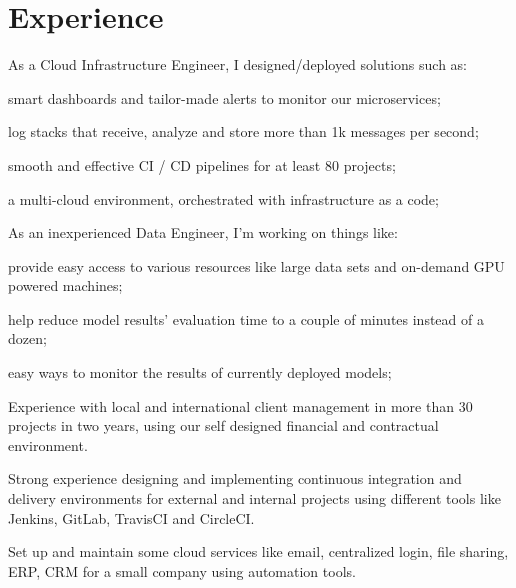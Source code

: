 \documentclass[]{deedy-resume-openfont}
\begin{document}
\begin{minipage}[t]{0.66\textwidth}
    \section{Experience}
    As a Cloud Infrastructure Engineer, I designed/deployed solutions such as:
    \vspace{\topsep} %
    \begin{tightemize}
      \item smart dashboards and tailor-made alerts to monitor our microservices;
      \item log stacks that receive, analyze and store more than 1k messages per second;
      \item smooth and effective CI / CD pipelines for at least 80 projects;
      \item a multi-cloud environment, orchestrated with infrastructure as a code;
    \end{tightemize}
    As an inexperienced Data Engineer, I'm working on things like:
    \begin{tightemize}
      \item provide easy access to various resources like large data sets and on-demand GPU powered machines;
      \item help reduce model results' evaluation time to a couple of minutes instead of a dozen;
      \item easy ways to monitor the results of currently deployed models;
    \end{tightemize}
    \begin{tightemize}
    \item Experience with local and international client management in more
        than 30 projects in two years, using our self designed financial and
        contractual environment.
    \item Strong experience designing and implementing continuous integration
        and delivery environments for external and internal projects using
        different tools like Jenkins, GitLab, TravisCI and CircleCI.
    \item Set up and maintain some cloud services like email, centralized login,
        file sharing, ERP, CRM for a small company using automation tools.

\end{tightemize}
\end{minipage}
\end{document}
